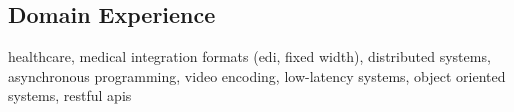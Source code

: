 \documentclass[11pt,a4paper,sans]{moderncv}        %
\begin{document}
\subsection{Domain Experience}
healthcare, medical integration formats (edi, fixed width), \newline
distributed systems, asynchronous programming, video encoding, low-latency
systems, object oriented systems, restful apis

% 



\end{document}
